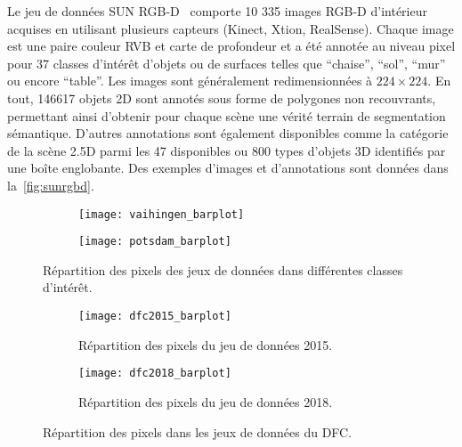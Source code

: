Le jeu de données SUN RGB-D~\cite{song_sun_2015} comporte 10 335 images \glsdesc{RGB-D} d'intérieur acquises en utilisant plusieurs capteurs (Kinect, Xtion, RealSense). Chaque image est une paire couleur \gls{RVB} et carte de profondeur et a été annotée au niveau pixel pour 37 classes d'intérêt d'objets ou de surfaces telles que ``chaise'', ``sol'', ``mur'' ou encore ``table''. Les images sont généralement redimensionnées à $224\times224$. En tout, \num{146617} objets 2D sont annotés sous forme de polygones non recouvrants, permettant ainsi d'obtenir pour chaque scène une vérité terrain de segmentation sémantique. D'autres annotations sont également disponibles comme la catégorie de la scène \num{2,5}D parmi les 47 disponibles ou 800 types d'objets 3D identifiés par une boîte englobante.
Des exemples d'images  et d'annotations sont données dans la~\cref{fig:sunrgbd}.

\begin{figure}[h]
	\begin{subfigure}{\textwidth}
		\texttt{[image: vaihingen\_barplot]}
	\end{subfigure}
	\begin{subfigure}{\textwidth}
		\texttt{[image: potsdam\_barplot]}
	\end{subfigure}
	\caption{Répartition des pixels des jeux de données  dans différentes classes d'intérêt.}
	\label{fig:isprs_barplots}
\end{figure}


\begin{figure}[h]
	\begin{subfigure}[t]{\textwidth}
		\texttt{[image: dfc2015\_barplot]}
		\caption{Répartition des pixels du jeu de données  2015.}
		\label{fig:dfc2015_barplot}
	\end{subfigure}
	\begin{subfigure}[t]{\textwidth}
		\texttt{[image: dfc2018\_barplot]}
		\caption{Répartition des pixels du jeu de données  2018.}
		\label{fig:dfc2018_barplot}
	\end{subfigure}
	\caption{Répartition des pixels dans les jeux de données du \glsdesc{DFC}.}
\end{figure}


